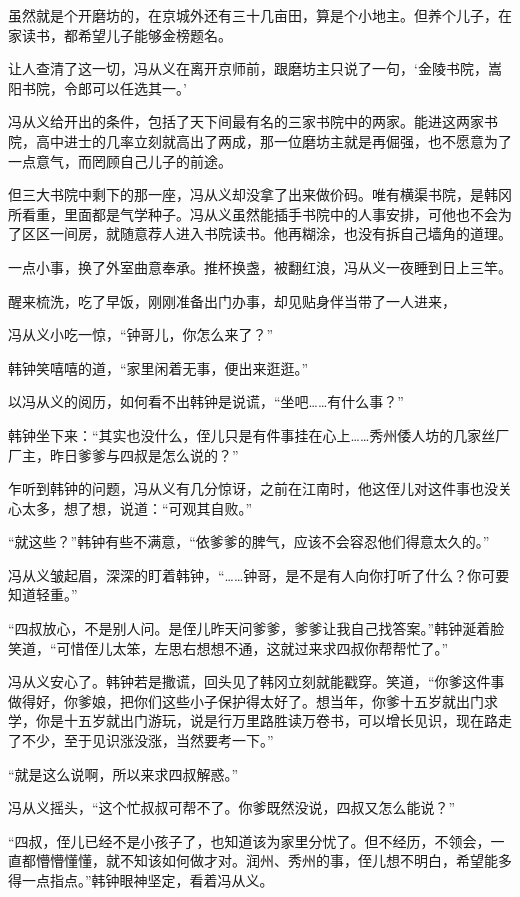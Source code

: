 虽然就是个开磨坊的，在京城外还有三十几亩田，算是个小地主。但养个儿子，在家读书，都希望儿子能够金榜题名。

让人查清了这一切，冯从义在离开京师前，跟磨坊主只说了一句，‘金陵书院，嵩阳书院，令郎可以任选其一。’

冯从义给开出的条件，包括了天下间最有名的三家书院中的两家。能进这两家书院，高中进士的几率立刻就高出了两成，那一位磨坊主就是再倔强，也不愿意为了一点意气，而罔顾自己儿子的前途。

但三大书院中剩下的那一座，冯从义却没拿了出来做价码。唯有横渠书院，是韩冈所看重，里面都是气学种子。冯从义虽然能插手书院中的人事安排，可他也不会为了区区一间房，就随意荐人进入书院读书。他再糊涂，也没有拆自己墙角的道理。

一点小事，换了外室曲意奉承。推杯换盏，被翻红浪，冯从义一夜睡到日上三竿。

醒来梳洗，吃了早饭，刚刚准备出门办事，却见贴身伴当带了一人进来，

冯从义小吃一惊，“钟哥儿，你怎么来了？”

韩钟笑嘻嘻的道，“家里闲着无事，便出来逛逛。”

以冯从义的阅历，如何看不出韩钟是说谎，“坐吧……有什么事？”

韩钟坐下来：“其实也没什么，侄儿只是有件事挂在心上……秀州倭人坊的几家丝厂厂主，昨日爹爹与四叔是怎么说的？”

乍听到韩钟的问题，冯从义有几分惊讶，之前在江南时，他这侄儿对这件事也没关心太多，想了想，说道：“可观其自败。”

“就这些？”韩钟有些不满意，“依爹爹的脾气，应该不会容忍他们得意太久的。”

冯从义皱起眉，深深的盯着韩钟，“……钟哥，是不是有人向你打听了什么？你可要知道轻重。”

“四叔放心，不是别人问。是侄儿昨天问爹爹，爹爹让我自己找答案。”韩钟涎着脸笑道，“可惜侄儿太笨，左思右想想不通，这就过来求四叔你帮帮忙了。”

冯从义安心了。韩钟若是撒谎，回头见了韩冈立刻就能戳穿。笑道，“你爹这件事做得好，你爹娘，把你们这些小子保护得太好了。想当年，你爹十五岁就出门求学，你是十五岁就出门游玩，说是行万里路胜读万卷书，可以增长见识，现在路走了不少，至于见识涨没涨，当然要考一下。”

“就是这么说啊，所以来求四叔解惑。”

冯从义摇头，“这个忙叔叔可帮不了。你爹既然没说，四叔又怎么能说？”

“四叔，侄儿已经不是小孩子了，也知道该为家里分忧了。但不经历，不领会，一直都懵懵懂懂，就不知该如何做才对。润州、秀州的事，侄儿想不明白，希望能多得一点指点。”韩钟眼神坚定，看着冯从义。

